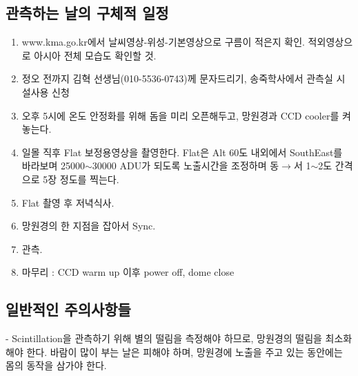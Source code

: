 \documentclass[11pt]{article}
\begin{document}
\subsection{관측하는 날의 구체적 일정}
\begin{enumerate}
	\item www.kma.go.kr\cite{kma}에서 날씨영상-위성-기본영상으로 구름이 적은지 확인. 적외영상으로 아시아 전체 모습도 확인할 것.
	
	\item 정오 전까지 김혁 선생님(010-5536-0743)께 문자드리기, 송죽학사에서 관측실 시설사용 신청
	
	\item 오후 5시에 온도 안정화를 위해 돔을 미리 오픈해두고, 망원경과 CCD cooler를 켜놓는다.
	
	\item 일몰 직후 Flat 보정용영상을 촬영한다. Flat은 Alt 60도 내외에서 SouthEast를 바라보며 25000$\sim$30000 ADU가 되도록 노출시간을 조정하며 동$\longrightarrow$서 1$\sim$2도 간격으로 5장 정도를 찍는다.
	
	\item Flat 촬영 후 저녁식사.
	
	\item 망원경의 한 지점을 잡아서 Sync.
	
	\item 관측.
	
	\item 마무리 : CCD warm up 이후 power off, dome close
	
\end{enumerate}

\subsection{일반적인 주의사항들}
- Scintillation을 관측하기 위해 별의 떨림을 측정해야 하므로, 망원경의 떨림을 최소화해야 한다. 바람이 많이 부는 날은 피해야 하며, 망원경에 노출을 주고 있는 동안에는 몸의 동작을 삼가야 한다.
\end{document}
